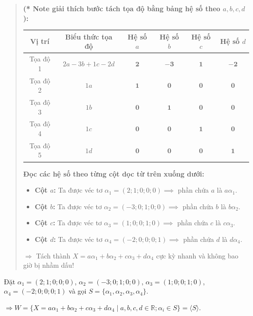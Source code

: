 \documentclass[12pt,a4paper]{article}
\newcommand{\R}{\mathbb{R}}
\begin{document}
\begin{quote}
\small\textbf{(* Note giải thích bước tách tọa độ bằng bảng hệ số theo $a, b, c, d$):}
\begin{center}
\renewcommand{\arraystretch}{1.15}
\setlength{\tabcolsep}{6pt}
\footnotesize
\begin{tabular}{|c|c|c|c|c|c|}
\hline
\textbf{Vị trí} & \textbf{Biểu thức tọa độ} & \textbf{Hệ số $a$} & \textbf{Hệ số $b$} & \textbf{Hệ số $c$} & \textbf{Hệ số $d$} \\
\hline
Tọa độ 1 & $2a - 3b + 1c - 2d$ & $\mathbf{2}$ & $\mathbf{-3}$ & $\mathbf{1}$ & $\mathbf{-2}$ \\
\hline
Tọa độ 2 & $1a$ & $\mathbf{1}$ & $\mathbf{0}$ & $\mathbf{0}$ & $\mathbf{0}$ \\
\hline
Tọa độ 3 & $1b$ & $\mathbf{0}$ & $\mathbf{1}$ & $\mathbf{0}$ & $\mathbf{0}$ \\
\hline
Tọa độ 4 & $1c$ & $\mathbf{0}$ & $\mathbf{0}$ & $\mathbf{1}$ & $\mathbf{0}$ \\
\hline
Tọa độ 5 & $1d$ & $\mathbf{0}$ & $\mathbf{0}$ & $\mathbf{0}$ & $\mathbf{1}$ \\
\hline
\end{tabular}
\end{center}
\textbf{Đọc các hệ số theo từng cột dọc từ trên xuống dưới:}
\begin{itemize}[noitemsep,topsep=2pt]
\item \textbf{Cột $a$:} Ta được véc tơ $\alpha_1 = (2; 1; 0; 0; 0) \implies$ phần chứa $a$ là $a\alpha_1$.
\item \textbf{Cột $b$:} Ta được véc tơ $\alpha_2 = (-3; 0; 1; 0; 0) \implies$ phần chứa $b$ là $b\alpha_2$.
\item \textbf{Cột $c$:} Ta được véc tơ $\alpha_3 = (1; 0; 0; 1; 0) \implies$ phần chứa $c$ là $c\alpha_3$.
\item \textbf{Cột $d$:} Ta được véc tơ $\alpha_4 = (-2; 0; 0; 0; 1) \implies$ phần chứa $d$ là $d\alpha_4$.
\end{itemize}
$\Rightarrow$ Tách thành $X = a\alpha_1 + b\alpha_2 + c\alpha_3 + d\alpha_4$ cực kỳ nhanh và không bao giờ bị nhầm dấu!
\end{quote}

Đặt $\alpha_1 = (2; 1; 0; 0; 0)$, $\alpha_2 = (-3; 0; 1; 0; 0)$, $\alpha_3 = (1; 0; 0; 1; 0)$, $\alpha_4 = (-2; 0; 0; 0; 1)$ và gọi $S = \{ \alpha_1, \alpha_2, \alpha_3, \alpha_4 \}$.

$\Rightarrow W = \{ X = a\alpha_1 + b\alpha_2 + c\alpha_3 + d\alpha_4 \mid a, b, c, d \in \R; \alpha_i \in S \} = \langle S \rangle$.
\end{document}
